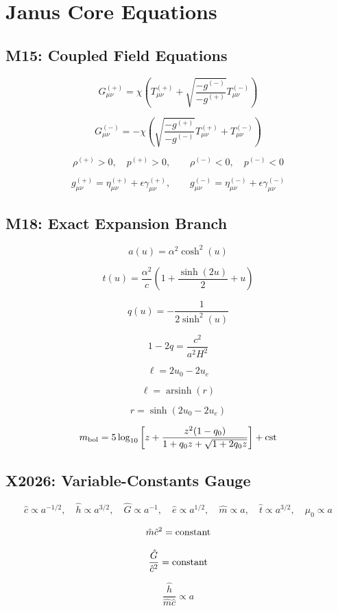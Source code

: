 
\section*{Janus Core Equations}

\subsection*{M15: Coupled Field Equations}

\[
G^{(+)}_{\mu\nu}
=
\chi \left(
T^{(+)}_{\mu\nu}
+ \sqrt{\frac{-g^{(-)}}{-g^{(+)}}} T^{(-)}_{\mu\nu}
\right)
\]

\[
G^{(-)}_{\mu\nu}
=
-\chi \left(
\sqrt{\frac{-g^{(+)}}{-g^{(-)}}} T^{(+)}_{\mu\nu}
+ T^{(-)}_{\mu\nu}
\right)
\]

\[
\rho^{(+)} > 0,\quad p^{(+)} > 0,\qquad
\rho^{(-)} < 0,\quad p^{(-)} < 0
\]

\[
g^{(+)}_{\mu\nu} = \eta^{(+)}_{\mu\nu} + \epsilon \gamma^{(+)}_{\mu\nu},
\qquad
g^{(-)}_{\mu\nu} = \eta^{(-)}_{\mu\nu} + \epsilon \gamma^{(-)}_{\mu\nu}
\]

\subsection*{M18: Exact Expansion Branch}

\[
a(u) = \alpha^2 \cosh^2(u)
\]

\[
t(u) = \frac{\alpha^2}{c}\left(1 + \frac{\sinh(2u)}{2} + u\right)
\]

\[
q(u) = -\frac{1}{2\sinh^2(u)}
\]

\[
1 - 2q = \frac{c^2}{a^2H^2}
\]

\[
\ell = 2u_0 - 2u_e
\]

\[
\ell = \operatorname{arsinh}(r)
\]

\[
r = \sinh(2u_0 - 2u_e)
\]

\[
m_{\rm bol}
=
5\log_{10}
\left[
z + \frac{z^2(1-q_0)}
{1 + q_0 z + \sqrt{1 + 2q_0z}}
\right]
+ {\rm cst}
\]

\subsection*{X2026: Variable-Constants Gauge}

\[
\hat c \propto a^{-1/2},\quad
\hat h \propto a^{3/2},\quad
\hat G \propto a^{-1},\quad
\hat e \propto a^{1/2},\quad
\hat m \propto a,\quad
\hat t \propto a^{3/2},\quad
\hat\mu_0 \propto a
\]

\[
\hat m \hat c^2 = {\rm constant}
\]

\[
\frac{\hat G}{\hat c^2} = {\rm constant}
\]

\[
\frac{\hat h}{\hat m\hat c} \propto a
\]

